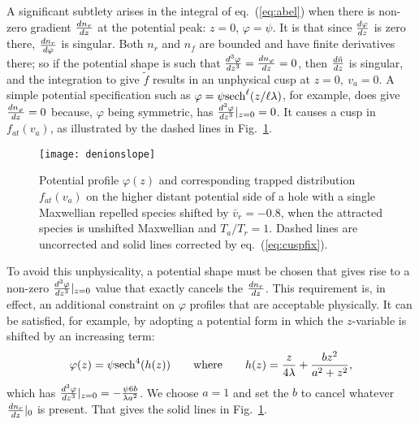 \documentclass[aip,pop,article-title]{revtex4-2}
\begin{document}
A significant subtlety arises in the integral of eq.\ (\ref{eq:abel}) when
there is non-zero gradient ${dn_r\over dz}$ at the potential peak:
$z=0$, $\varphi=\psi$.  It is that since ${d\varphi\over dz}$ is zero
there, ${dn_r\over d\varphi}$ is singular. Both $n_r$ and $n_f$ are
bounded and have finite derivatives there; so if the potential shape
is such that ${d^3\varphi\over dz^3}={dn_\varphi\over dz}=0$, then
${d\tilde n\over dz}$ is singular, and the integration to give
$\tilde f$ results in an unphysical cusp at $z=0,\ v_a=0$. A simple
potential specification such as
$\varphi={\psi}{\rm sech}^\ell(z/\ell\lambda)$, for example, does give
${dn_\varphi\over dz}=0$ because, $\varphi$ being symmetric, has
${d^3\varphi\over dz^3}|_{z=0}=0$. It causes a cusp in $f_{at}(v_a)$, as
illustrated by the dashed lines in Fig.\ \ref{denionslope}. 
\begin{figure}\centering
  \texttt{[image: denionslope]}
  \caption{Potential profile $\varphi(z)$ and corresponding trapped
    distribution $f_{at}(v_a)$ on the higher distant potential side of
    a hole with a single Maxwellian repelled species shifted by
    $\bar v_r=-0.8$, when the attracted species is unshifted Maxwellian
    and $T_a/T_r=1$. Dashed lines are uncorrected and solid lines
    corrected by eq.\ (\ref{eq:cuspfix}). \label{denionslope}}
\end{figure}
To avoid
this unphysicality, a potential shape must be chosen that gives rise
to a non-zero ${d^3\varphi\over dz^3}|_{z=0}$ value that exactly
cancels the ${dn_r\over dz}$. This requirement is, in effect, an
additional constraint on $\varphi$ profiles that are acceptable
physically. It can be satisfied, for example, by adopting a potential form
in which the $z$-variable is shifted by an increasing term:
\begin{equation}
  \label{eq:cuspfix}
  \varphi(z)={\psi}{\rm sech}^4(h(z))\qquad {\rm where}\qquad 
  h(z)={z\over 4\lambda} + {bz^2\over a^2+z^2},
\end{equation}
which has ${d^3\varphi\over dz^3}|_{z=0}=-{\psi 6 b\over \lambda a^2}$. We choose $a=1$ and
set the $b$ to cancel whatever ${dn_r\over dz}|_0$ is present. That
gives the solid lines in  Fig.\ \ref{denionslope}.
\end{document}
